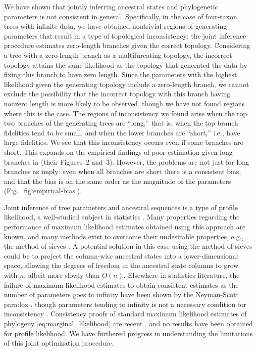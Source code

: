 \documentclass[11pt]{article}
\newcommand{\nCols}{n}
\begin{document}
We have shown that jointly inferring ancestral states and phylogenetic parameters \citep{Sagulenko2018-xl} is not consistent in general.
Specifically, in the case of four-taxon trees with infinite data, we have obtained nontrivial regions of generating parameters that result in a type of topological inconsistency: the joint inference procedure estimates zero-length branches given the correct topology.
Considering a tree with a zero-length branch as a multifurcating topology, the incorrect topology attains the same likelihood as the topology that generated the data by fixing this branch to have zero length.
Since the parameters with the highest likelihood given the generating topology include a zero-length branch, we cannot exclude the possibility that the incorrect topology with this branch having nonzero length is more likely to be observed, though we have not found regions where this is the case.
The regions of inconsistency we found arise when the top two branches of the generating trees are ``long,'' that is, when the top branch fidelities tend to be small, and when the lower branches are ``short,'' i.e., have large fidelities.
We see that this inconsistency occurs even if some branches are short.
This expands on the empirical findings of poor estimation given long branches in \citet{Sagulenko2018-xl} (their Figures~2 and~3).
However, the problems are not just for long branches as \citet{Sagulenko2018-xl} imply: even when all branches are short there is a consistent bias, and that the bias is on the same order as the magnitude of the parameters (Fig.~\ref{fig:empirical-bias}).

Joint inference of tree parameters and ancestral sequences is a type of profile likelihood, a well-studied subject in statistics \citep{Murphy2000-ry}.
Many properties regarding the performance of maximum likelihood estimates obtained using this approach are known, and many methods exist to overcome their undesirable properties, e.g., the method of sieves \citep{Geman1982}.
A potential solution in this case using the method of sieves could be to project the column-wise ancestral states into a lower-dimensional space, allowing the degrees of freedom in the ancestral state columns to grow with $\nCols$, albeit more slowly than $O(\nCols)$.
Elsewhere in statistics literature, the failure of maximum likelihood estimates to obtain consistent estimates as the number of parameters goes to infinity have been shown by the Neyman-Scott paradox \citep{Neyman1948-tt}, though parameters tending to infinity is not a necessary condition for inconsistency \citep{LeCam1990}.
Consistency proofs of standard maximum likelihood estimates of phylogeny \eqref{eq:marginal_likelihood} are recent \citep{Allman2008-wd,Chai2011-ff,RoyChoudhury2015-ta}, and no results have been obtained for profile likelihood.
We have furthered progress in understanding the limitations of this joint optimization procedure.
\end{document}
